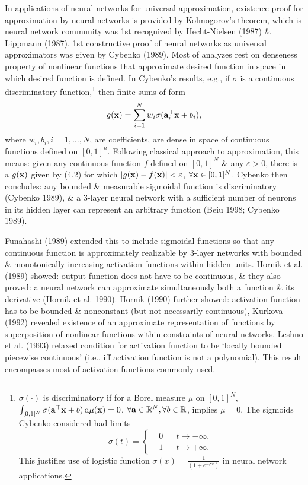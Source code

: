 \documentclass{article}
\begin{document}
\begin{enumerate}
\begin{itemize}
\begin{itemize}
			In applications of neural networks for universal approximation, existence proof for approximation by neural networks is provided by {\sc Kolmogorov}'s theorem, which is neural network community was 1st recognized by Hecht-Nielsen (1987) \& Lippmann (1987). 1st constructive proof of neural networks as universal approximators was given by Cybenko (1989). Most of analyzes rest on denseness property of nonlinear functions that approximate desired function in space in which desired function is defined. In {\sc Cybenko}'s results, e.g., if $\sigma$ is a continuous discriminatory function,\footnote{$\sigma(\cdot)$ is discriminatory if for a Borel measure $\mu$ on $[0,1]^N$, $\int_{[0,1]^N} \sigma({\bf a}^\top{\bf x} + b)\,{\rm d}\mu({\bf x}) = 0$, $\forall{\bf a}\in\mathbb{R}^N,\forall b\in\mathbb{R}$, implies $\mu = 0$. The sigmoids {\sc Cybenko} considered had limits 
			\begin{equation}
				\sigma(t) = \left\{\begin{split}
					&0&&t\to-\infty,\\
					&1&&t\to+\infty.
				\end{split}\right.
			\end{equation}
			This justifies use of logistic function $\sigma(x) = \frac{1}{(1 + e^{-\beta x})}$ in neural network applications.} then finite sums of form
			\begin{equation}
				g({\bf x}) = \sum_{i=1}^N w_i\sigma({\bf a}_i^\top{\bf x} + b_i),
			\end{equation}
			where $w_i,b_i,i = 1,\ldots,N$, are coefficients, are dense in space of continuous functions defined on $[0,1]^n$. Following classical approach to approximation, this means: given any continuous function $f$ defined on $[0,1]^N$ \& any $\varepsilon > 0$, there is a $g({\bf x})$ given by (4.2) for which $|g({\bf x}) - f({\bf x})| < \varepsilon$, $\forall{\bf x}\in[0,1]^N$. {\sc Cybenko} then concludes: any bounded \& measurable sigmoidal function is discriminatory (Cybenko 1989), \& a 3-layer neural network with a sufficient number of neurons in its hidden layer can represent an arbitrary function (Beiu 1998; Cybenko 1989).
			
			Funahashi (1989) extended this to include sigmoidal functions so that any continuous function is approximately realizable by 3-layer networks with bounded \& monotonically increasing activation functions within hidden units. Hornik et al. (1989) showed: output function does not have to be continuous, \& they also proved: a neural network can approximate simultaneously both a function \& its derivative (Hornik et al. 1990). Hornik (1990) further showed: activation function has to be bounded \& nonconstant (but not necessarily continuous), Kurkova (1992) revealed existence of an approximate representation of functions by superposition of nonlinear functions within constraints of neural networks. Leshno et al. (1993) relaxed condition for activation function to be `locally bounded piecewise continuous' (i.e., iff activation function is not a polynomial). This result encompasses most of activation functions commonly used.
			

\end{itemize}
\end{itemize}
\end{enumerate}
\end{document}
